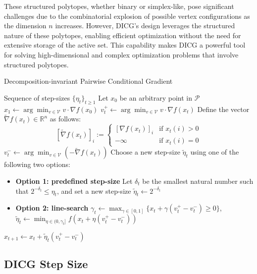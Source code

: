 These structured polytopes, whether binary or simplex-like, pose significant challenges due to the combinatorial explosion of possible vertex configurations as the dimension \(n\) increases. However, DICG's design leverages the structured nature of these polytopes, enabling efficient optimization without the need for extensive storage of the active set. This capability makes DICG a powerful tool for solving high-dimensional and complex optimization problems that involve structured polytopes.

\newpage

\begin{algorithm}[H]
	\caption{Decomposition-invariant Pairwise Conditional Gradient}
	\label{alg:dicg}
	\begin{algorithmic}[1]
		\REQUIRE Sequence of step-sizes $\{\eta_t\}_{t \geq 1}$
		\STATE Let $x_0$ be an arbitrary point in $\mathcal{P}$
		\STATE $x_1 \leftarrow \arg \min_{v \in \mathcal{V}} v \cdot \nabla f(x_0)$
		\STATE $v_t^+ \leftarrow \arg \min_{v \in \mathcal{V}} v \cdot \nabla f(x_t)$
		\STATE Define the vector $\widetilde{\nabla} f(x_t) \in \mathbb{R}^n$ as follows:
		\[
		[\widetilde{\nabla} f(x_t)]_i := 
		\begin{cases}
			[\nabla f(x_t)]_i & \text{if } x_t(i) > 0 \\
			-\infty & \text{if } x_t(i) = 0
		\end{cases}
		\]
		\STATE $v_t^- \leftarrow \arg \min_{v \in \mathcal{V}} (-\widetilde{\nabla} f(x_t))$
		\STATE Choose a new step-size $\widetilde{\eta}_t$ using one of the following two options:
		\begin{itemize}
			\item \textbf{Option 1: predefined step-size}
			\STATE Let $\delta_t$ be the smallest natural number such that $2^{-\delta_t} \leq \eta_t$, and set a new step-size $\widetilde{\eta}_t \leftarrow 2^{-\delta_t}$
			\item \textbf{Option 2: line-search}
			\STATE $\gamma_t \leftarrow \max_{\gamma \in [0, 1]} \{x_t + \gamma (v_t^+ - v_t^-) \geq 0\}$, $\widetilde{\eta}_t \leftarrow \min_{\eta \in (0, \gamma_t]} f(x_t + \eta (v_t^+ - v_t^-))$
		\end{itemize}
		\STATE $x_{t+1} \leftarrow x_t + \widetilde{\eta}_t (v_t^+ - v_t^-)$
		\ENDFOR
	\end{algorithmic}
\end{algorithm}


\subsection{DICG Step Size}


